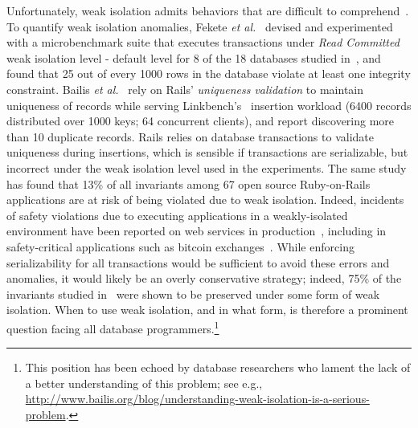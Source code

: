 Unfortunately, weak isolation admits behaviors that are difficult to
comprehend~\cite{berenson}. To quantify weak isolation anomalies,
Fekete \emph{et al.}~\cite{feketevldb09} devised and experimented with
a microbenchmark suite that executes transactions under \emph{Read
Committed} weak isolation level - default level for 8 of the 18
databases studied in~\cite{bailishotos}, and found that 25 out of
every 1000 rows in the database violate at least one integrity
constraint. Bailis \emph{et al.}~\cite{bailisferal} rely on Rails'
\emph{uniqueness validation} to maintain uniqueness of records while
serving Linkbench's~\cite{linkbench} insertion workload (6400 records
distributed over 1000 keys; 64 concurrent clients), and report
discovering more than 10 duplicate records.  Rails relies on database
transactions to validate uniqueness during insertions, which is
sensible if transactions are serializable, but incorrect under the
weak isolation level used in the experiments. The same study has found
that 13\% of all invariants among 67 open source Ruby-on-Rails
applications are at risk of being violated due to weak isolation.
Indeed, incidents of safety violations due to executing applications
in a weakly-isolated environment have been reported on web services in
production~\cite{starbucksbug, scimedbug}, including in
safety-critical applications such as bitcoin
exchanges~\cite{poloniexbug, bitcoinbug}. While enforcing
serializability for all transactions would be sufficient to avoid
these errors and anomalies, it would likely be an overly conservative
strategy; indeed, 75\% of the invariants studied in~\cite{bailisferal}
were shown to be preserved under some form of weak isolation.  When to
use weak isolation, and in what form, is therefore a prominent
question facing all database programmers.\footnote{This position has
been echoed by database researchers who lament the lack of a better
understanding of this problem; see e.g., \url{
  http://www.bailis.org/blog/understanding-weak-isolation-is-a-serious-problem}.}

